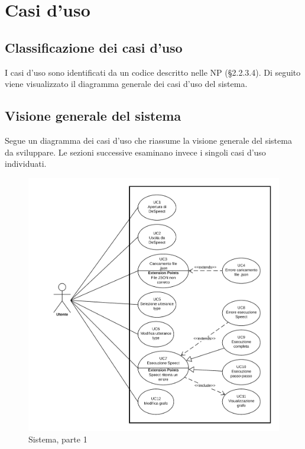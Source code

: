 \documentclass[../AnalisideiRequisiti.tex]{subfiles}
\begin{document}
	
	\chapter{Casi d'uso}
	\section{Classificazione dei casi d'uso}
	I casi d'uso sono identificati da un codice descritto nelle NP (§2.2.3.4).
	Di seguito viene visualizzato il diagramma generale dei casi d'uso del sistema.
	
	\section{Visione generale del sistema}
	Segue un diagramma dei casi d'uso che riassume la visione generale del sistema da sviluppare. Le sezioni successive esaminano invece i singoli casi d'uso individuati.
	
	\begin{figure}[p]
		\centering
		\includegraphics[width=\textwidth]{../img/UCp1.png}
		\caption{Sistema, parte 1}
	\end{figure}
	
\end{document}
